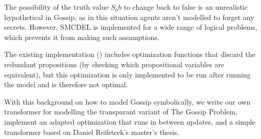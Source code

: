 

The possibility of the truth value $S_ab$ to change back to false is an unrealistic hypothetical in Gossip, as in this situation 
agents aren't modelled to forget any secrets. However, SMCDEL is implemented for a wide range of logical problems, which prevents it 
from making such assumptions. 

The existing implementation (\cite{GattingerThesis2018}) includes optimization functions that discard the redundant propositions 
(by checking which propositional variables are equivalent), but this optimization is only implemented to be run after running the 
model and is therefore not optimal. 

With this background on how to model Gossip symbolically, we write our own transformer for modelling the transparant variant 
of The Gossip Problem, implement an adapted optimization that runs in between updates, and a simple transformer based on Daniel 
Reifsteck's master's thesis. 
